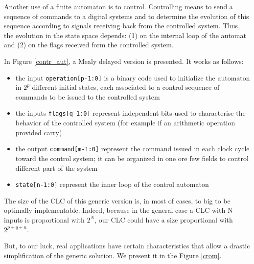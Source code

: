 Another use of a finite automaton is to control. Controlling means to send a sequence of commands to a digital systems and to determine the evolution of this sequence according to signals receiving back from the controlled system. Thus, the evolution in the state space depends: (1) on the internal loop of the automat and (2) on the flags received form the controlled system.


In Figure \ref{contr_aut}, a Mealy delayed version is presented. It works as follows:
\begin{itemize}
    \item the input {\tt operation[p-1:0]} is a binary code  used to initialize the automaton in $2^p$ different initial states, each associated to a control sequence of commands to be issued to the controlled system
    \item the inputs {\tt flags[q-1:0]} represent independent bits used to characterise the behavior of the controlled system (for example if an arithmetic operation provided carry)
    \item the output {\tt command[m-1:0]} represent the command issued in each clock cycle toward the control system; it can be organized in one ore few fields to control different part of the system
    \item {\tt state[n-1:0]} represent the inner loop of the control automaton
\end{itemize}

The size of the CLC of this generic version is, in most of cases, to big to be optimally implementable. Indeed, because in the general case a CLC with N inputs is proportional with $2^N$, our CLC could have a size proportional with $2^{p+q+n}$.

But, to our luck, real applications have certain characteristics that allow a drastic simplification of the generic solution. We present it in the Figure \ref{crom}.


